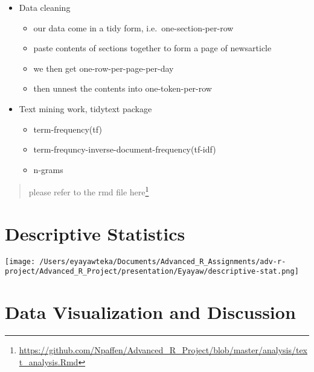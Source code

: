 \documentclass[
  10pt,
  ignorenonframetext,
]{beamer}
\DeclareRobustCommand{\href}[2]{#2\footnote{\url{#1}}}
\providecommand{\tightlist}{%
  \setlength{\itemsep}{0pt}\setlength{\parskip}{0pt}}
\begin{document}
\begin{frame}{}
\protect\hypertarget{section}{}
\begin{itemize}
\item
  Data cleaning

  \begin{itemize}
  \tightlist
  \item
    our data come in a tidy form, i.e.~one-section-per-row
  \item
    paste contents of sections together to form a page of newsarticle
  \item
    we then get one-row-per-page-per-day
  \item
    then unnest the contents into one-token-per-row
  \end{itemize}
\item
  Text mining work, tidytext package \citep{R-tidytext}

  \begin{itemize}
  \tightlist
  \item
    term-frequency(tf)
  \item
    term-frequncy-inverse-document-frequency(tf-idf)
  \item
    n-grams
  \end{itemize}
\end{itemize}

\begin{quote}
please refer to the rmd file
\href{https://github.com/Npaffen/Advanced_R_Project/blob/master/analysis/text_analysis.Rmd}{here}
\end{quote}
\end{frame}

\hypertarget{descriptive-statistics}{%
\section{Descriptive Statistics}\label{descriptive-statistics}}

\begin{frame}{}
\protect\hypertarget{section-1}{}
\texttt{[image: /Users/eyayawteka/Documents/Advanced\_R\_Assignments/adv-r-project/Advanced\_R\_Project/presentation/Eyayaw/descriptive-stat.png]}
\end{frame}

\hypertarget{data-visualization-and-discussion}{%
\section{Data Visualization and
Discussion}\label{data-visualization-and-discussion}}
\end{document}
